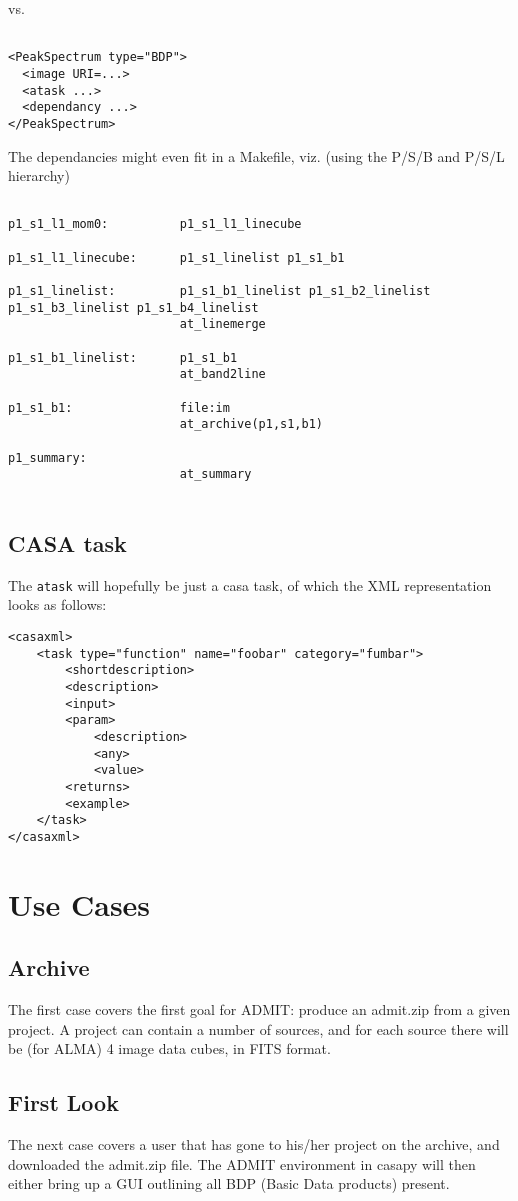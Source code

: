 \documentclass{report}
\begin{document}
vs.

\footnotesize
\begin{verbatim}

<PeakSpectrum type="BDP"> 
  <image URI=...> 
  <atask ...>
  <dependancy ...>
</PeakSpectrum>

\end{verbatim}
\normalsize



The dependancies might even fit in a Makefile, viz. (using the P/S/B and P/S/L hierarchy)


\footnotesize
\begin{verbatim}

p1_s1_l1_mom0:          p1_s1_l1_linecube

p1_s1_l1_linecube:      p1_s1_linelist p1_s1_b1

p1_s1_linelist:         p1_s1_b1_linelist p1_s1_b2_linelist p1_s1_b3_linelist p1_s1_b4_linelist
                        at_linemerge

p1_s1_b1_linelist:      p1_s1_b1
                        at_band2line

p1_s1_b1:               file:im
                        at_archive(p1,s1,b1)

p1_summary:
                        at_summary
        
\end{verbatim}
\normalsize


\subsection{CASA task}

The {\tt atask} will hopefully be just a casa task, of which the XML representation
looks as follows:
\footnotesize
\begin{verbatim}
<casaxml>
    <task type="function" name="foobar" category="fumbar">
        <shortdescription>
        <description>
        <input>
	    <param>
	        <description>
	        <any>
	        <value>
        <returns>
        <example>
    </task>  
</casaxml>
\end{verbatim}
\normalsize

\section{Use Cases}

\subsection{Archive}

The first case covers the first goal for ADMIT:  produce an admit.zip from
a given project.   A project can contain a number of sources, and
for each source there will be (for ALMA) 4 image data cubes, in FITS
format.

\subsection{First Look}

The next case covers a user that has gone to his/her project on the
archive, and downloaded the admit.zip file. The ADMIT environment in
casapy will then either bring up a GUI outlining all BDP (Basic Data
products) present.
\end{document}
